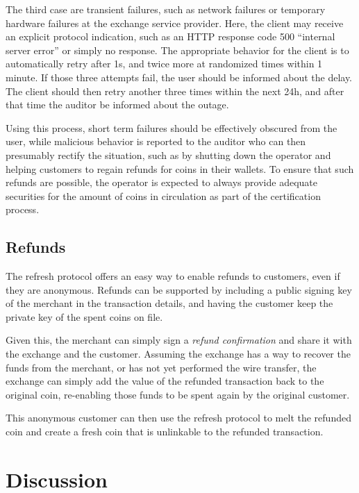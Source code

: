 \documentclass{llncs}
\begin{document}
The third case are transient failures, such as network failures or
temporary hardware failures at the exchange service provider.  Here, the
client may receive an explicit protocol indication, such as an HTTP
response code 500 ``internal server error'' or simply no response.
The appropriate behavior for the client is to automatically retry
after 1s, and twice more at randomized times within 1 minute.
If those three attempts fail, the user should be informed about the
delay.  The client should then retry another three times within the
next 24h, and after that time the auditor be informed about the outage.

Using this process, short term failures should be effectively obscured
from the user, while malicious behavior is reported to the auditor who
can then presumably rectify the situation, such as by shutting down
the operator and helping customers to regain refunds for coins in
their wallets.  To ensure that such refunds are possible, the operator
is expected to always provide adequate securities for the amount of
coins in circulation as part of the certification process.

\subsection{Refunds}

The refresh protocol offers an easy way to enable refunds to
customers, even if they are anonymous.  Refunds can be supported
by including a public signing key of the merchant in the transaction
details, and having the customer keep the private key of the spent
coins on file.

Given this, the merchant can simply sign a {\em refund confirmation}
and share it with the exchange and the customer.  Assuming the exchange has
a way to recover the funds from the merchant, or has not yet performed
the wire transfer, the exchange can simply add the value of the refunded
transaction back to the original coin, re-enabling those funds to be
spent again by the original customer.

This anonymous customer can then use the refresh protocol to melt the
refunded coin and create a fresh coin that is unlinkable to the
refunded transaction.


\section{Discussion}
\end{document}
